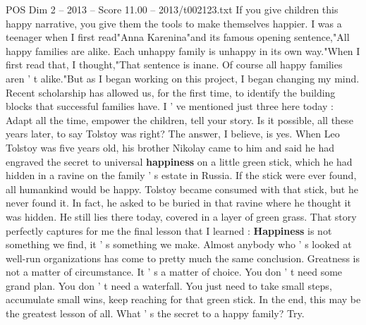 \begin{textsample}{POS Dim 2 – 2013 – Score 11.00 – 2013/t002123.txt}
If you give children this happy narrative, you give them the tools to make themselves happier.
I was a teenager when I first read"Anna Karenina"and its famous opening sentence,"All happy families are alike.
Each unhappy family is unhappy in its own way."When I first read that, I thought,"That sentence is inane.
Of course all happy families aren ' t alike."But as I began working on this project, I began changing my mind.
Recent scholarship has allowed us, for the first time, to identify the building blocks that successful families have.
I ' ve mentioned just three here today : Adapt all the time, empower the children, tell your story.
Is it possible, all these years later, to say Tolstoy was right?
The answer, I believe, is yes.
When Leo Tolstoy was five years old, his brother Nikolay came to him and said he had engraved the secret to universal \textbf{happiness} on a little green stick, which he had hidden in a ravine on the family ' s estate in Russia.
If the stick were ever found, all humankind would be happy.
Tolstoy became consumed with that stick, but he never found it.
In fact, he asked to be buried in that ravine where he thought it was hidden.
He still lies there today, covered in a layer of green grass.
That story perfectly captures for me the final lesson that I learned : \textbf{Happiness} is not something we find, it ' s something we make.
Almost anybody who ' s looked at well-run organizations has come to pretty much the same conclusion.
Greatness is not a matter of circumstance.
It ' s a matter of choice.
You don ' t need some grand plan.
You don ' t need a waterfall.
You just need to take small steps, accumulate small wins, keep reaching for that green stick.
In the end, this may be the greatest lesson of all.
What ' s the secret to a happy family?
Try.

\end{textsample}
